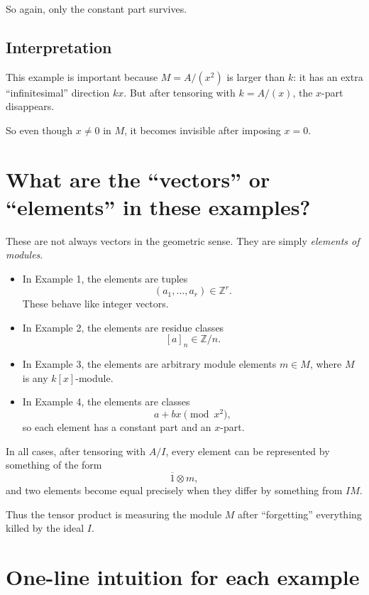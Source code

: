 \documentclass[12pt,a4paper]{article}
\theoremstyle{plain}
\theoremstyle{definition}      %
\begin{document}
	So again, only the constant part survives.
	
	\subsection{Interpretation}
	
	This example is important because \(M=A/(x^2)\) is larger than \(k\): it has an extra ``infinitesimal'' direction \(kx\). But after tensoring with \(k=A/(x)\), the \(x\)-part disappears.
	
	So even though \(x\neq 0\) in \(M\), it becomes invisible after imposing \(x=0\).
	
	\section{What are the ``vectors'' or ``elements'' in these examples?}
	
	These are not always vectors in the geometric sense. They are simply \emph{elements of modules}.
	
	\begin{itemize}
		\item In Example 1, the elements are tuples
		\[
		(a_1,\dots,a_r)\in \mathbb Z^r.
		\]
		These behave like integer vectors.
		
		\item In Example 2, the elements are residue classes
		\[
		[a]_n\in \mathbb Z/n.
		\]
		
		\item In Example 3, the elements are arbitrary module elements \(m\in M\), where \(M\) is any \(k[x]\)-module.
		
		\item In Example 4, the elements are classes
		\[
		a+bx \pmod{x^2},
		\]
		so each element has a constant part and an \(x\)-part.
	\end{itemize}
	
	In all cases, after tensoring with \(A/I\), every element can be represented by something of the form
	\[
	\overline{1}\otimes m,
	\]
	and two elements become equal precisely when they differ by something from \(IM\).
	
	Thus the tensor product is measuring the module \(M\) after ``forgetting'' everything killed by the ideal \(I\).
	
	\section{One-line intuition for each example}
	
\end{document}
